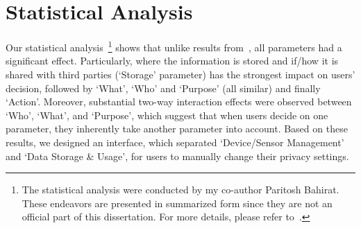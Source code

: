 %

\section{Statistical Analysis}\label{sec:statAlys2}
Our statistical analysis~\footnote{The statistical analysis were conducted by my co-author Paritosh Bahirat. These endeavors are presented in summarized form since they are not an official part of this dissertation. For more details, please refer to~\cite{He2018data}.} shows that unlike results from~\cite{bahiratiui2018}, all parameters had a significant effect. Particularly, where the information is stored and if/how it is shared with third parties (`Storage' parameter) has the strongest impact on users' decision, followed by `What', `Who' and `Purpose' (all similar) and finally `Action'. Moreover, substantial two-way interaction effects were observed between `Who', `What', and `Purpose', which suggest that when users decide on one parameter, they inherently take another parameter into account. Based on these results, we designed an interface, which separated `Device/Sensor Management' and `Data Storage \& Usage', for users to manually change their privacy settings. 

